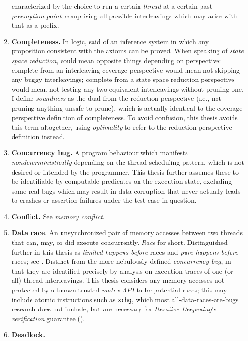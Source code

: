 \begin{enumerate}
		characterized by the choice to run a certain {\em thread} at a certain past {\em preemption point},
		comprising all possible interleavings which may arise with that as a prefix.
	\item {\bf Completeness.}
		In logic, said of an inference system in which any proposition consistent with the axioms can be proved.
		When speaking of {\em state space reduction},
		could mean opposite things depending on perspective:
		complete from an interleaving coverage perspective would mean not skipping any buggy interleavings;
		complete from a state space reduction perspective would mean not testing any two equivalent interleavings
		without pruning one.
		I define {\em soundness} as the dual from the reduction perspective (i.e., not pruning anything unsafe to prune),
		which is actually identical to the coverage perspective definition of completeness.
		To avoid confusion, this thesis avoids this term altogether,
		using {\em optimality} to refer to the reduction perspective definition instead.
	\item {\bf Concurrency bug.}
		A program behaviour which manifests {\em nondeterministically} depending on the thread scheduling pattern,
		which is not desired or intended by the programmer.
		This thesis further assumes these to be identifiable by computable predicates on the execution state,
		excluding some real bugs which may result in data corruption that never actually leads to crashes or assertion
		failures under the test case in question.
	\item {\bf Conflict.} See {\em memory conflict}.
	\item {\bf Data race.}
		An unsynchronized pair of memory accesses between two threads that can, may, or did execute concurrently.
		{\em Race} for short.
		Distinguished further in this thesis as {\em limited happens-before} races and {\em pure happens-before} races;
		see \sect{\ref{sec:background-datarace}}.
		Distinct from the more nebulously-defined {\em concurrency bug},
		in that they are identified precisely by analysis on execution traces of one (or all) thread interleavings.
		This thesis considers any memory accesses not protected by a known trusted {\em mutex API}
		to be potential races;
		this may include atomic instructions such as {\tt xchg},
		which most all-data-races-are-bugs research does not include,
		but are necessary for {\em Iterative Deepening}'s {\em verification} guarantee
		(\sect{\ref{sec:quicksand-soundness}}).
	\item {\bf Deadlock.}

\end{enumerate}
